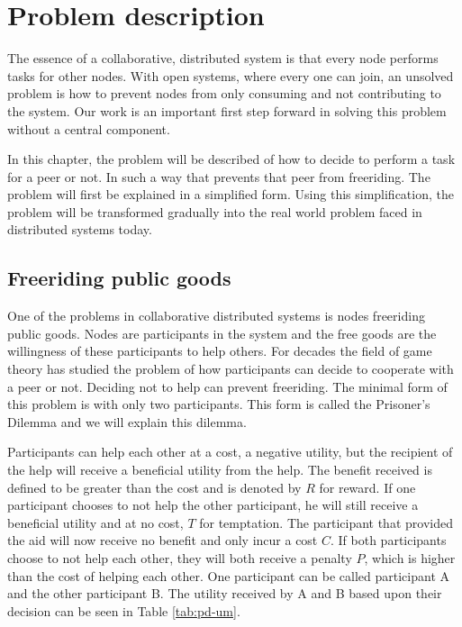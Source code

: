 \chapter{Problem description}
The essence of a collaborative, distributed system is that every node performs tasks for other nodes.
With open systems, where every one can join, an unsolved problem is how to prevent nodes
from only consuming and not contributing to the system.
Our work is an important first step forward in solving this problem without a central component.

In this chapter, the problem will be described of how to decide to perform a task for a peer or not.
In such a way that prevents that peer from freeriding.
The problem will first be explained in a simplified form.
Using this simplification, the problem will be transformed gradually
into the real world problem faced in distributed systems today.

\section{Freeriding public goods}
One of the problems in collaborative distributed systems is nodes freeriding public goods.
Nodes are participants in the system and the free goods are the willingness of these participants to help others.
For decades the field of game theory has studied the problem of how
participants can decide to cooperate with a peer or not\cite{Hardin-Tragedy}.
Deciding not to help can prevent freeriding.
The minimal form of this problem is with only two participants.
This form is called the Prisoner's Dilemma\cite{Nowak-PrisonerDilemma}\cite{Lai-Incentives}
and we will explain this dilemma.

Participants can help each other at a cost, a negative utility,
but the recipient of the help will receive a beneficial utility from the help.
The benefit received is defined to be greater
than the cost and is denoted by $R$ for reward.
If one participant chooses to not help the other participant,
he will still receive a beneficial utility and at no cost, $T$ for temptation.
The participant that provided the aid will now receive no benefit and only incur a cost $C$.
If both participants choose to not help each other,
they will both receive a penalty $P$, which is higher than the cost of helping each other.
One participant can be called participant A and the other participant B.
The utility received by A and B based upon their decision can be seen in Table \ref{tab:pd-um}.

